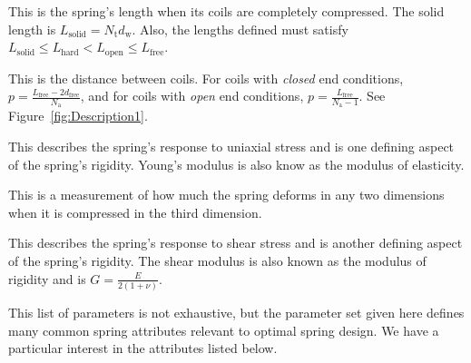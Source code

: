 \documentclass[10pt]{article}
\begin{document}
\begin{description}[leftmargin=!,labelwidth=\widthof{\bfseries Young's Modulus (E)}]
			\item[Solid Length ($\boldsymbol{L}_{\text{solid}}$)] This is the spring's length when its coils are completely compressed. The solid length is $L_{\text{solid}} = N_{\text{t}}d_{\text{w}}$. Also, the lengths defined must satisfy ${L_{\text{solid}} \le L_{\text{hard}} < L_{\text{open}} \le L_{\text{free}}}$.
					
			\item[Pitch ($\boldsymbol{p}$)] This is the distance between coils. For coils with \textit{closed} end conditions, ${p = \frac{L_{\text{free}}-2d_{\text{free}}}{N_{\text{a}}}}$, and for coils with \textit{open} end conditions, $p = \frac{L_{\text{free}}}{N_{\text{a}}-1}$. See Figure~\ref{fig:Description1}.			
			
			\item[Young's Modulus ($\boldsymbol{E}$)] This describes the spring's response to uniaxial stress and is one defining aspect of the spring's rigidity. Young's modulus is also know as the modulus of elasticity.
			
			\item[Poisson Ratio ($\boldsymbol{\nu}$)] This is a measurement of how much the spring deforms in any two dimensions when it is compressed in the third dimension.
			
			\item[Shear Modulus ($\boldsymbol{G}$)] This describes the spring's response to shear stress and is another defining aspect of the spring's rigidity. The shear modulus is also known as the modulus of rigidity and is $G = \frac{E}{2(1+\nu)}$. 
		
		\end{description}

This list of parameters is not exhaustive, but the parameter set given here defines many common spring attributes relevant to optimal spring design. We have a particular interest in the attributes listed below.
\end{document}
